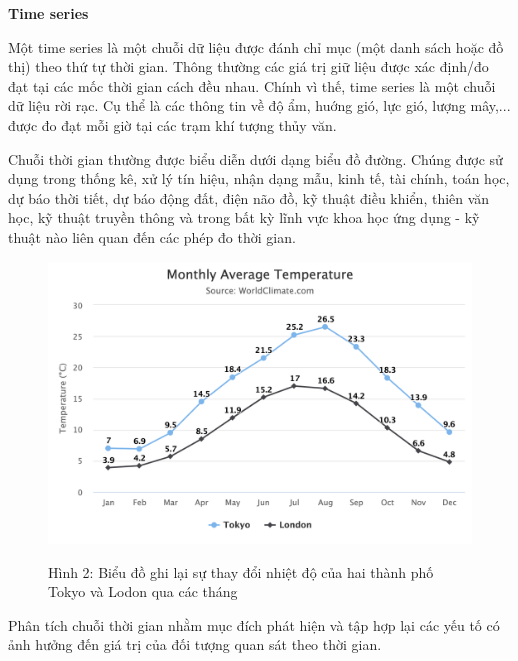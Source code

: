 \vspace{1cm}
\changefontsizes{15pt}
\setlength{\parindent}{0cm}
\textbf{Time series}

\vspace{1cm}
\changefontsizes{13pt}
Một time series là một chuỗi dữ liệu được đánh chỉ mục (một danh sách hoặc đồ thị) theo thứ tự thời gian. Thông thường các giá trị giữ liệu được xác định/đo đạt tại các mốc thời gian cách đều nhau. Chính vì thế, time series là một chuỗi dữ liệu rời rạc. Cụ thể là các thông tin về độ ẩm, huớng gió, lực gió, lượng mây,... được đo đạt mỗi giờ tại các trạm khí tượng thủy văn.

\bigskip
Chuỗi thời gian thường được biểu diễn dưới dạng biểu đồ đường. Chúng được sử dụng trong thống kê, xử lý tín hiệu, nhận dạng mẫu, kinh tế, tài chính, toán học, dự báo thời tiết, dự báo động đất, điện não đồ, kỹ thuật điều khiển, thiên văn học, kỹ thuật truyền thông và trong bất kỳ lĩnh vực khoa học ứng dụng - kỹ thuật nào liên quan đến các phép đo thời gian.



\begin{center}
	\begin{figure}[htp]
		\begin{center}
			\includegraphics[scale=.3]{./images/weather.png}
		\end{center}
	\label{fig1}{Hình 2: Biểu đồ ghi lại sự thay đổi nhiệt độ của hai thành phố Tokyo và Lodon qua các tháng}
	\end{figure}
\end{center}


\bigskip
Phân tích chuỗi thời gian nhằm mục đích phát hiện và tập hợp lại các yếu tố có ảnh hưởng đến giá trị của đối tượng quan sát theo thời gian.


